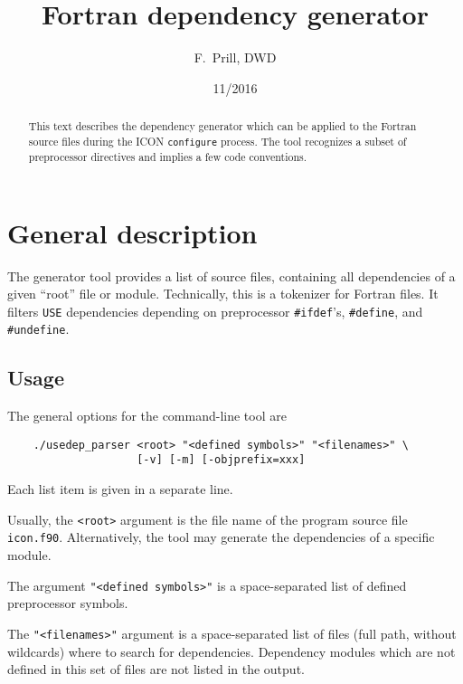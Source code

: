 \documentclass[DIV16]{scrartcl}
\title{Fortran dependency generator}
\author{F.\ Prill, DWD}
\date{11/2016}
\begin{document}
\maketitle

\begin{abstract}
  This text describes the dependency generator which can be applied to
  the Fortran source files during the ICON \texttt{configure}
  process. The tool recognizes a subset of preprocessor directives and
  implies a few code conventions.
\end{abstract}


\section{General description}

The generator tool provides a list of source files, containing all
dependencies of a given ``root'' file or module.
%
Technically, this is a tokenizer for Fortran files. It filters
\texttt{USE} dependencies depending on preprocessor
\texttt{\#ifdef}'s, \texttt{\#define}, and \texttt{\#undefine}.


\subsection{Usage}

The general options for the command-line tool are
\begin{verbatim}
    ./usedep_parser <root> "<defined symbols>" "<filenames>" \
                    [-v] [-m] [-objprefix=xxx]
\end{verbatim}
Each list item is given in a separate line.

Usually, the \texttt{<root>} argument is the file name of the program
source file \texttt{icon.f90}.  Alternatively, the tool may generate
the dependencies of a specific module.

The argument \texttt{"<defined symbols>"} is a space-separated list of
defined preprocessor symbols.

The \texttt{"<filenames>"} argument is a space-separated list of files
(full path, without wildcards) where to search for dependencies.
Dependency modules which are not defined in this set of files are not
listed in the output.
\end{document}

